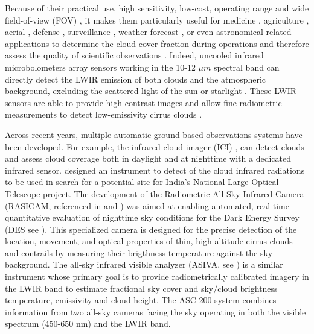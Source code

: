 \documentclass[amt, article]{copernicus}
\begin{document}
Because of their practical use, high sensitivity, low-cost, operating range and wide field-of-view (FOV) \citep{Rogalski2011,Rogalski2014,Kimata2018}, it makes them particularly useful for medicine \citep{ring2012infrared}, agriculture \citep{ishimwe2014applications}, aerial \citep{wilczak1996ground}, defense \citep{gallo1993low, akula2011thermal}, surveillance \citep{wong2009effective}, weather forecast \citep{sun2008whole, Liandrat2017}, or even astronomical related applications to determine the cloud cover fraction during operations and therefore assess the quality of scientific observations \citep{Klebe2010, lewis2010radiometric,Klebe2012,Klebe2014, reil2014update}. Indeed, uncooled infrared microbolometers array sensors working in the 10-12 $\mu m$ spectral band can directly detect the LWIR emission of both clouds and the atmospheric background, excluding the scattered light of the sun or starlight \citep{Houghton1972}. These LWIR sensors are able to provide high-contrast images and allow fine radiometric measurements to detect low-emissivity cirrus clouds \citep{lewis2010radiometric,Shaw_2013}.

Across recent years, multiple automatic ground-based observations systems have been developed. For example, the infrared cloud imager (ICI) \citep{ICI}, can detect clouds and assess cloud coverage both in daylight and at nighttime with a dedicated infrared sensor. \citet{Sharma2015} designed an instrument to detect of the cloud infrared radiations to be used in search for a potential site for India’s National Large Optical Telescope project. The development of the Radiometric All-Sky Infrared Camera (RASICAM, referenced in \citealt{lewis2010radiometric} and \citealt{reil2014update}) was aimed at enabling automated, real-time quantitative evaluation of nighttime sky conditions for the Dark Energy Survey (DES see \citealt{DES}). This specialized camera is designed for the precise detection of the location, movement, and optical properties of thin, high-altitude cirrus clouds and contrails by measuring their brigthness temperature against the sky background. The all-sky infrared visible analyzer (ASIVA, see \citealt{Klebe2014}) is a similar instrument whose primary goal is to provide radiometrically calibrated imagery in the LWIR band to estimate fractional sky cover and sky/cloud brightness temperature, emissivity and cloud height. The ASC-200 system \citep{rs13091852} combines information from two all-sky cameras facing the sky operating in both the visible spectrum (450-650 nm) and the LWIR band.
\end{document}
